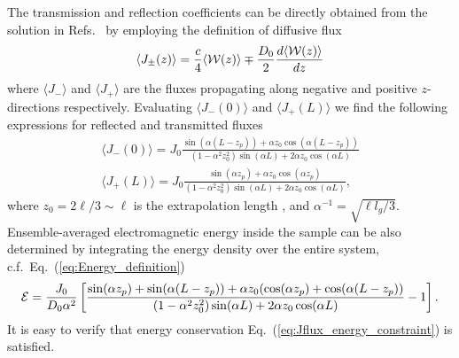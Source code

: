The transmission and reflection coefficients can be directly obtained from the solution in Refs.~\cite{1993_Lisyansky_diffusint,1999_van_Rossum} by employing the definition of diffusive flux\cite{1953_Morse}
\begin{equation}
\langle J_{\pm}(z)\rangle = \frac{c}{4} \langle {\cal W}(z)\rangle \mp \frac{D_0}{2} \frac{d\langle {\cal W}(z)\rangle }{dz}
\label{eq:diffusive_flux}
\end{equation}
where $ \langle J_{-}\rangle$ and $ \langle J_{+}\rangle $ are the fluxes propagating along negative and positive $z$-directions respectively. Evaluating $\langle J_{-}(0)\rangle$ and $\langle J_{+}(L)\rangle$ we find the following expressions for reflected and transmitted fluxes
\begin{eqnarray}
\langle J_- (0)\rangle  = J_0 \frac{\sin(\alpha  (L-z _p)) + \alpha z_0 \cos(\alpha (L-z _p))}{(1-\alpha ^2 z_0 ^2) \sin(\alpha L) + 2 \alpha z_0 \cos(\alpha L)}
\label{eq:Jreflectionflux} \\
\langle J_+ (L)\rangle  = J_0 \frac{\sin(\alpha z_p) + \alpha z _0 \cos(\alpha z_p)}{(1-\alpha^2 z_0^2) \sin(\alpha L) + 2 \alpha z_0 \cos(\alpha L)},
\label{eq:Jtransmissionflux}
\end{eqnarray}
where $z_0=2\ell/3\sim\ell$ is the extrapolation length \cite{1991_zhu_z0}, and $\alpha^{-1}=\sqrt{\ell l_g/3}$. Ensemble-averaged electromagnetic energy inside the sample can be also determined by integrating the energy density over the entire system, c.f.~Eq.~(\ref{eq:Energy_definition})
\begin{equation}
{\cal E}=
\frac{J_0}{D_0 \alpha ^2} \left[\frac
{\sin(\alpha z_p) + \sin(\alpha (L-z_p))+\alpha z_0 (\cos(\alpha z_p) + \cos(\alpha (L-z_p))}
{(1-\alpha^2 z_0^2)\sin(\alpha L)+2\alpha z_0\cos(\alpha L)}-1\right].
\label{eq:diffusive_energy}
\end{equation}
It is easy to verify that energy conservation Eq.~(\ref{eq:Jflux_energy_constraint}) is satisfied.

